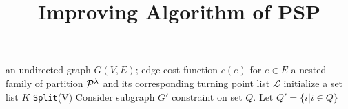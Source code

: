\documentclass{article}
\title{Improving Algorithm of PSP}
\begin{document}
\maketitle
\begin{algorithm}
\caption{}\label{alg:psp_a}
\begin{algorithmic}[1]
\REQUIRE an undirected graph $G(V, E)$; edge cost function $c(e)$ for $e\in E$
\ENSURE a nested family of partition $\P^{\lambda}$ and its corresponding turning point list $\mathcal{L}$
\STATE initialize a set list $K$
\STATE \texttt{Split}(V)
\STATE Consider subgraph $G'$ constraint on set $Q$. Let $Q' = \{i | i \in Q\}$
\ENDFUNCTION

\end{algorithmic}
\end{algorithm}
\end{document}
